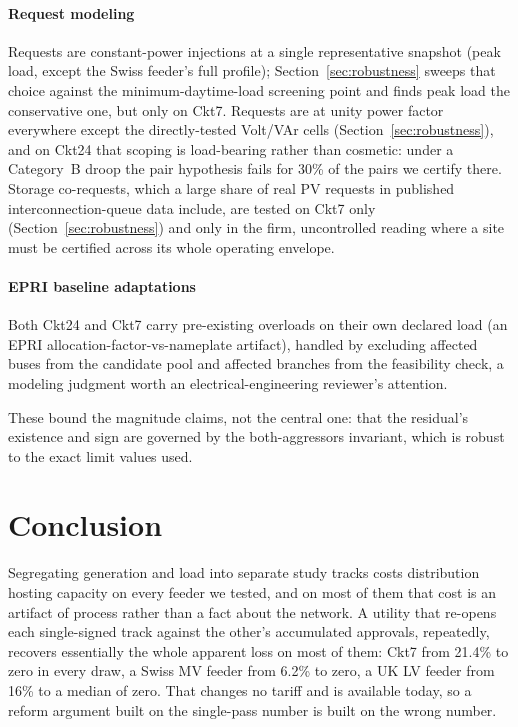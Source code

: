 \documentclass[review,authoryear,12pt]{elsarticle}
\begin{document}
\paragraph{Request modeling} Requests are constant-power injections at a
single representative snapshot (peak load, except the Swiss feeder's full
profile); Section~\ref{sec:robustness} sweeps that choice against the
minimum-daytime-load screening point and finds peak load the conservative one,
but only on Ckt7. Requests are at unity power factor everywhere except the
directly-tested Volt/VAr cells (Section~\ref{sec:robustness}), and on Ckt24
that scoping is load-bearing rather than cosmetic: under a Category~B droop
the pair hypothesis fails for 30\% of the pairs we certify there.
Storage co-requests, which a large share of real PV requests in published
interconnection-queue data include, are tested on Ckt7 only
(Section~\ref{sec:robustness}) and only in the firm, uncontrolled reading where
a site must be certified across its whole operating envelope.

\paragraph{EPRI baseline adaptations} Both Ckt24 and Ckt7 carry pre-existing
overloads on their own declared load (an EPRI allocation-factor-vs-nameplate
artifact), handled by excluding affected buses from the candidate pool and
affected branches from the feasibility check, a modeling judgment worth an
electrical-engineering reviewer's attention.

These bound the magnitude claims, not the central one: that the residual's
existence and sign are governed by the both-aggressors invariant, which is
robust to the exact limit values used.

\section{Conclusion}
\label{sec:conclusion}

Segregating generation and load into separate study tracks costs distribution
hosting capacity on every feeder we tested, and on most of them that cost is an
artifact of process rather than a fact about the network. A utility that
re-opens each single-signed track against the other's accumulated approvals,
repeatedly, recovers essentially the whole apparent loss on most of them:
Ckt7 from 21.4\% to zero in every draw, a Swiss MV feeder from 6.2\% to zero, a
UK LV feeder from 16\% to a median of zero. That changes no tariff and is
available today, so a reform argument built on the single-pass number is built
on the wrong number.
\end{document}
